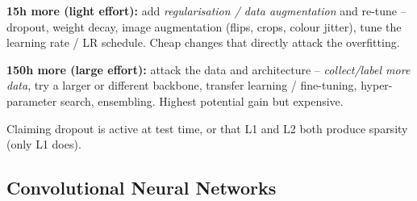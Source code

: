 \documentclass[10pt,a4paper]{article}
\begin{document}
\begin{enumerate}[leftmargin=*,label=\textbf{Q\arabic*.}]
\begin{answerbox}
\textbf{15h more (light effort):} add \emph{regularisation / data augmentation} and re-tune -- dropout, weight decay, image augmentation (flips, crops, colour jitter), tune the learning rate / LR schedule. Cheap changes that directly attack the overfitting.

\textbf{150h more (large effort):} attack the data and architecture -- \emph{collect/label more data}, try a larger or different backbone, transfer learning / fine-tuning, hyper-parameter search, ensembling. Highest potential gain but expensive.
\end{answerbox}

\end{enumerate}

\begin{examtipbox}
Claiming dropout is active at test time, or that L1 and L2 both produce sparsity (only L1 does).
\end{examtipbox}

\subsection{Convolutional Neural Networks}
\end{document}
